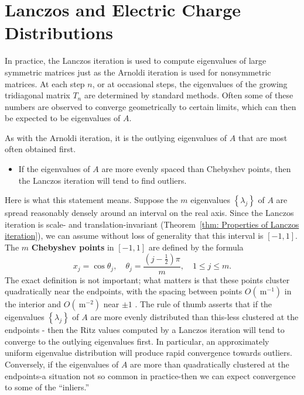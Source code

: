 \section{Lanczos and Electric Charge Distributions}

In practice, the Lanczos iteration is used to compute eigenvalues of large symmetric matrices just as the Arnoldi iteration is used for nonsymmetric matrices. At each step $n$, or at occasional steps, the eigenvalues of the growing tridiagonal matrix $T_n$ are determined by standard methods. Often some of these numbers are observed to converge geometrically to certain limits, which can then be expected to be eigenvalues of $A$.

As with the Arnoldi iteration, it is the outlying eigenvalues of $A$ that are most often obtained first.

\begin{itemize}
    \item If the eigenvalues of $A$ are more evenly spaced than Chebyshev points, then the Lanczos iteration will tend to find outliers.
\end{itemize}

Here is what this statement means. Suppose the $m$ eigenvalues $\left\{\lambda_j\right\}$ of $A$ are spread reasonably densely around an interval on the real axis. Since the Lanczos iteration is scale- and translation-invariant (Theorem~\ref{thm: Properties of Lanczos iteration}), we can assume without loss of generality that this interval is $[-1,1]$. The $m$ \textbf{Chebyshev points} in $[-1,1]$ are defined by the formula
\[
    x_j=\cos \theta_j, \quad \theta_j=\frac{\left(j-\frac{1}{2}\right) \pi}{m}, \quad 1 \leq j \leq m. 
\]
The exact definition is not important; what matters is that these points cluster quadratically near the endpoints, with the spacing between points $O\left(\mathrm{~m}^{-1}\right)$ in the interior and $O\left(\mathrm{~m}^{-2}\right)$ near $\pm 1$ . The rule of thumb asserts that if the eigenvalues $\left\{\lambda_j\right\}$ of $A$ are more evenly distributed than this-less clustered at the endpoints - then the Ritz values computed by a Lanczos iteration will tend to converge to the outlying eigenvalues first. In particular, an approximately uniform eigenvalue distribution will produce rapid convergence towards outliers. Conversely, if the eigenvalues of $A$ are more than quadratically clustered at the endpoints-a situation not so common in practice-then we can expect convergence to some of the ``inliers.''

